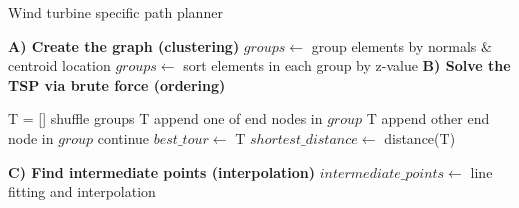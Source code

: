 \begin{algorithm} 
\caption{Wind turbine specific path planner}
\label{alg:1}
\begin{algorithmic}
   \State \textbf{A) Create the graph (clustering)}
   \State $groups \leftarrow$ group elements by normals $\&$ centroid location
   \State $groups \leftarrow$ sort elements in each group by z-value
\State \textbf{B) Solve the TSP via brute force (ordering)}
   
   

   
        \State T = []
        \State shuffle groups
        \State		T append one of end nodes in $group$
		\State	T append other end node in $group$
		\EndFor
		\State  continue
		\EndIf
            \State $best\_tour \leftarrow$ T 
            \State $shortest\_distance \leftarrow$ distance(T)
        \EndIf
    \EndWhile


    \State \textbf{C) Find intermediate points (interpolation)}
    \State $intermediate\_points \leftarrow$ line fitting and interpolation 
    
\end{algorithmic}

\end{algorithm}






